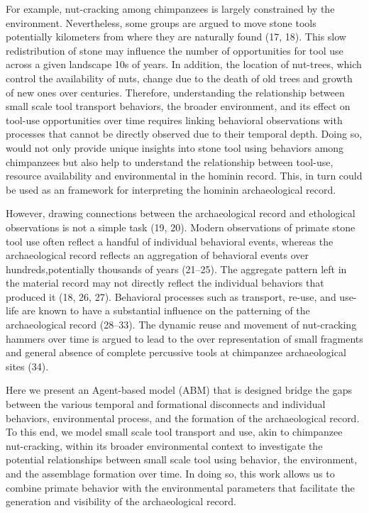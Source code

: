 \documentclass[9pt,twocolumn,twoside,]{pnas-new}
\begin{document}
For example, nut-cracking among chimpanzees is largely constrained by
the environment. Nevertheless, some groups are argued to move stone
tools potentially kilometers from where they are naturally found (17,
18). This slow redistribution of stone may influence the number of
opportunities for tool use across a given landscape 10s of years. In
addition, the location of nut-trees, which control the availability of
nuts, change due to the death of old trees and growth of new ones over
centuries. Therefore, understanding the relationship between small scale
tool transport behaviors, the broader environment, and its effect on
tool-use opportunities over time requires linking behavioral
observations with processes that cannot be directly observed due to
their temporal depth. Doing so, would not only provide unique insights
into stone tool using behaviors among chimpanzees but also help to
understand the relationship between tool-use, resource availability and
environmental in the hominin record. This, in turn could be used as an
framework for interpreting the hominin archaeological record.

However, drawing connections between the archaeological record and
ethological observations is not a simple task (19, 20). Modern
observations of primate stone tool use often reflect a handful of
individual behavioral events, whereas the archaeological record reflects
an aggregation of behavioral events over hundreds,potentially thousands
of years (21--25). The aggregate pattern left in the material record may
not directly reflect the individual behaviors that produced it (18, 26,
27). Behavioral processes such as transport, re-use, and use-life are
known to have a substantial influence on the patterning of the
archaeological record (28--33). The dynamic reuse and movement of
nut-cracking hammers over time is argued to lead to the over
representation of small fragments and general absence of complete
percussive tools at chimpanzee archaeological sites (34).

Here we present an Agent-based model (ABM) that is designed bridge the
gaps between the various temporal and formational disconnects and
individual behaviors, environmental process, and the formation of the
archaeological record. To this end, we model small scale tool transport
and use, akin to chimpanzee nut-cracking, within its broader
environmental context to investigate the potential relationships between
small scale tool using behavior, the environment, and the assemblage
formation over time. In doing so, this work allows us to combine primate
behavior with the environmental parameters that facilitate the
generation and visibility of the archaeological record.
\end{document}
